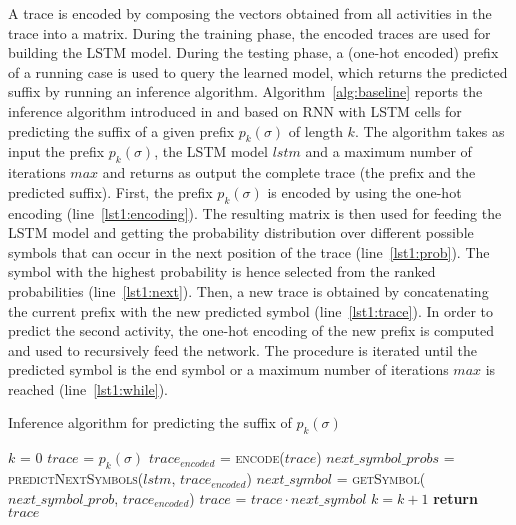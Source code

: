 A trace is encoded by composing the vectors obtained from all activities in the trace into a matrix. During the training phase, the encoded traces are used for building the LSTM model. During the testing phase, a (one-hot encoded) prefix of a running case is used to query the learned model, which returns the predicted suffix by running an inference algorithm.
Algorithm~\ref{alg:baseline} reports the inference algorithm introduced in \cite{niek96732} and based on RNN with LSTM cells for predicting the suffix of a given prefix $p_k(\sigma)$ of length $k$. The algorithm takes as input the prefix $p_k(\sigma)$, the LSTM model $lstm$ and a maximum number of iterations $max$ and returns as output the complete trace (the prefix and the predicted suffix).
First, the prefix $p_k(\sigma)$ is encoded by using the one-hot encoding (line~\ref{lst1:encoding}). The resulting matrix is then used for feeding the LSTM model and getting the probability distribution over different possible symbols that can occur in the next position of the trace (line~\ref{lst1:prob}). The symbol with the highest probability is hence selected from the ranked probabilities (line~\ref{lst1:next}). Then, a new trace is obtained by concatenating the current prefix with the new predicted symbol (line~\ref{lst1:trace}). In order to predict the second activity, the one-hot encoding of the new prefix is computed and used to recursively feed the network. The procedure is iterated until the predicted symbol is the end symbol or a maximum number of iterations $max$ is reached (line~\ref{lst1:while}).

\begin{algorithm}
	\caption{Inference algorithm for predicting the suffix of $p_k(\sigma)$}
	\label{alg:baseline}
	\begin{algorithmic}[1]
		\State $k$ = 0
		\State $trace$ = $p_k(\sigma)$
		\Do
		\State $trace_{encoded}$ = \textsc{encode}($trace$) \label{lst1:encoding}
		\State $next\_symbol\_probs$ = \textsc{predictNextSymbols}($lstm$, $trace_{encoded}$) \label{lst1:prob}
		\State $next\_symbol$ = \textsc{getSymbol}($next\_symbol\_prob$, $trace_{encoded}$) \label{lst1:next}
		\State $trace$ = $trace \cdot next\_symbol$\label{lst1:trace}
		\State $k = k + 1$
		\label{lst1:while}
		\State \textbf{return} $trace$
		\EndFunction
	\end{algorithmic}
\end{algorithm}

